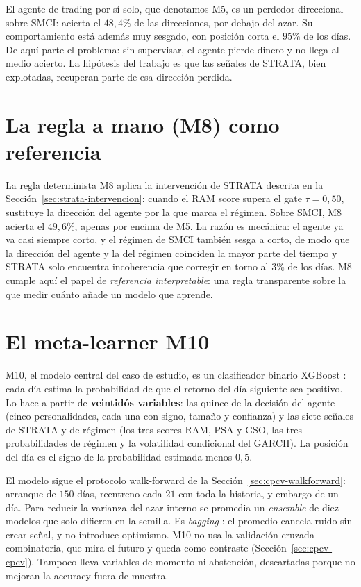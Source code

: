 El agente de trading por sí solo, que denotamos M5, es un perdedor direccional sobre SMCI: acierta el $48{,}4\%$ de las direcciones, por debajo del azar. Su comportamiento está además muy sesgado, con posición corta el $95\%$ de los días. De aquí parte el problema: sin supervisar, el agente pierde dinero y no llega al medio acierto. La hipótesis del trabajo es que las señales de STRATA, bien explotadas, recuperan parte de esa dirección perdida.

\section{La regla a mano (M8) como referencia}
\label{sec:m8}

La regla determinista M8 aplica la intervención de STRATA descrita en la Sección~\ref{sec:strata-intervencion}: cuando el RAM score supera el gate $\tau = 0{,}50$, sustituye la dirección del agente por la que marca el régimen. Sobre SMCI, M8 acierta el $49{,}6\%$, apenas por encima de M5. La razón es mecánica: el agente ya va casi siempre corto, y el régimen de SMCI también sesga a corto, de modo que la dirección del agente y la del régimen coinciden la mayor parte del tiempo y STRATA solo encuentra incoherencia que corregir en torno al $3\%$ de los días. M8 cumple aquí el papel de \emph{referencia interpretable}: una regla transparente sobre la que medir cuánto añade un modelo que aprende.

\section{El meta-learner M10}
\label{sec:m10}

M10, el modelo central del caso de estudio, es un clasificador binario XGBoost \cite{chen2016}: cada día estima la probabilidad de que el retorno del día siguiente sea positivo. Lo hace a partir de \textbf{veintidós variables}: las quince de la decisión del agente (cinco personalidades, cada una con signo, tamaño y confianza) y las siete señales de STRATA y de régimen (los tres scores RAM, PSA y GSO, las tres probabilidades de régimen y la volatilidad condicional del GARCH). La posición del día es el signo de la probabilidad estimada menos $0{,}5$.

El modelo sigue el protocolo walk-forward de la Sección~\ref{sec:cpcv-walkforward}: arranque de $150$ días, reentreno cada $21$ con toda la historia, y embargo de un día. Para reducir la varianza del azar interno se promedia un \emph{ensemble} de diez modelos que solo difieren en la semilla. Es \emph{bagging} \cite{breiman1996, dietterich2000}: el promedio cancela ruido sin crear señal, y no introduce optimismo. M10 no usa la validación cruzada combinatoria, que mira el futuro y queda como contraste (Sección~\ref{sec:cpcv-cpcv}). Tampoco lleva variables de momento ni abstención, descartadas porque no mejoran la accuracy fuera de muestra.

